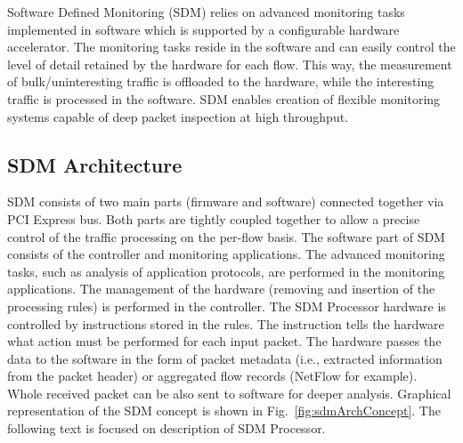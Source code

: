 Software Defined Monitoring (SDM) \cite{KekelyPusKorenekSDM} relies on advanced monitoring tasks implemented in software which is supported by a
configurable hardware accelerator. The monitoring tasks reside in the software and can easily control the level of detail retained 
by the hardware for each flow. This way, the measurement of bulk/uninteresting traffic is offloaded to the hardware, 
while the interesting traffic is processed in the software. SDM enables creation of flexible monitoring systems capable of deep packet
inspection at high throughput.

\subsection{SDM Architecture}
\label{sec:sdm}
SDM consists of two main parts (firmware and software) connected together via PCI Express bus. 
Both parts are tightly coupled together to allow a precise control of the traffic processing on the per-flow basis.
The software part of SDM consists of the controller and monitoring applications. 
The advanced monitoring tasks, such as analysis of application protocols, are performed in the monitoring applications.
The management of the hardware (removing and insertion of the processing rules) is performed in the controller.
The SDM Processor hardware is controlled by instructions stored in the rules.
The instruction tells the hardware what action must be performed for each input packet.
The hardware passes the data to the software in the form of packet metadata (i.e., extracted information from the packet header)
or aggregated flow records (NetFlow for example).
Whole received packet can be also sent to software for deeper analysis. 
Graphical representation of the SDM concept is shown in Fig.~\ref{fig:sdmArchConcept}.
The following text is focused on description of SDM Processor.

